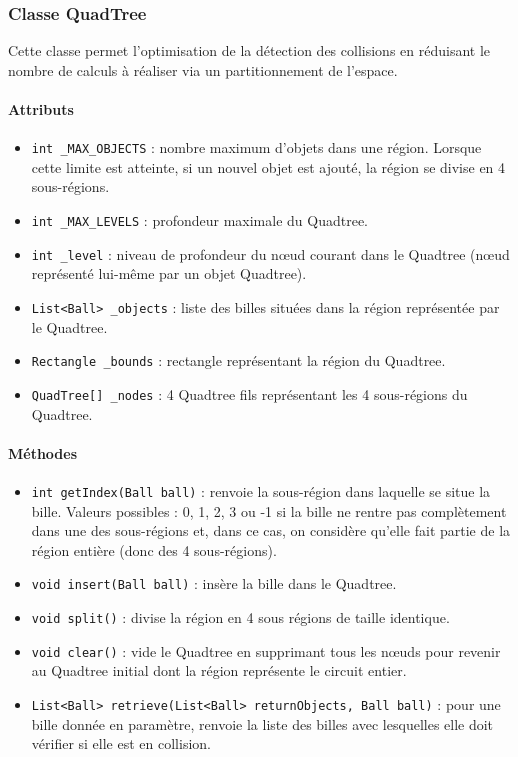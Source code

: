 \documentclass{report}
\begin{document}
\subsubsection{Classe QuadTree}

Cette classe permet l'optimisation de la détection des collisions en réduisant le nombre de calculs à réaliser via un partitionnement de l'espace.

\paragraph*{Attributs}
\begin{itemize}
\item \texttt{int \_MAX\_OBJECTS} : nombre maximum d'objets dans une région. Lorsque cette limite est atteinte, si un nouvel objet est ajouté, la région se divise en 4 sous-régions.
\item \texttt{int \_MAX\_LEVELS} : profondeur maximale du Quadtree.
\item \texttt{int \_level} : niveau de profondeur du nœud courant dans le Quadtree (nœud représenté lui-même par un objet Quadtree).
\item \texttt{List<Ball> \_objects} : liste des billes situées dans la région représentée par le Quadtree.
\item \texttt{Rectangle \_bounds} : rectangle représentant la région du Quadtree.
\item \texttt{QuadTree[] \_nodes} : 4 Quadtree fils représentant les 4 sous-régions du Quadtree.
\end{itemize}

\paragraph*{Méthodes}
\begin{itemize}
\item \texttt{int getIndex(Ball ball)} : renvoie la sous-région dans laquelle se situe la bille. Valeurs possibles : 0, 1, 2, 3 ou -1 si la bille ne rentre pas complètement dans une des sous-régions et, dans ce cas, on considère qu'elle fait partie de la région entière (donc des 4 sous-régions).
\item \texttt{void insert(Ball ball)} : insère la bille dans le Quadtree.
\item \texttt{void split()} : divise la région en 4 sous régions de taille identique.
\item \texttt{void clear()} : vide le Quadtree en supprimant tous les nœuds pour revenir au Quadtree initial dont la région représente le circuit entier.
\item \texttt{List<Ball> retrieve(List<Ball> returnObjects, Ball ball)} : pour une bille donnée en paramètre, renvoie la liste des billes avec lesquelles elle doit vérifier si elle est en collision.
\end{itemize}
\end{document}
